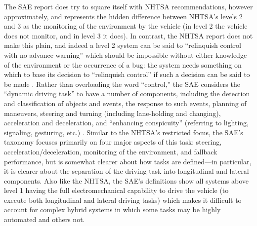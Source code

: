 The SAE report does try to square itself with NHTSA recommendations,
however approximately, and represents the hidden difference between
NHTSA's levels 2 and 3 as the monitoring of the environment by the
vehicle (in level 2 the vehicle does not monitor, and in level 3 it
does). In contrast, the NHTSA report does not make this plain, and
indeed a level 2 system can be said to ``relinquish control with no
advance warning'' which should be impossible without either knowledge of the
environment or the occurrence of a bug: the system needs something on
which to base its decision to ``relinquish control'' if such a decision
can be said to be made \cite[p. 5]{NHTSA}. Rather than overloading the word ``control,''
the SAE considers the ``dynamic driving task'' to have a number of
components, including the detection and classification of objects and
events, the response to such events, planning of maneuvers, steering
and turning (including lane-holding and changing), acceleration and
deceleration, and ``enhancing conspicuity'' (referring to lighting,
signaling, gesturing, etc.) \cite[p. 6]{SAE}. Similar to the NHTSA's
restricted focus, the SAE's taxonomy 
focuses primarily on four major aspects of this task:
steering, acceleration/deceleration, monitoring of the environment,
and fallback performance, but is somewhat clearer about how tasks are
defined---in particular, it is clearer about the separation of the
driving task into longitudinal and lateral components. Also like the
NHTSA, the SAE's definitions show all systems above level 1 having the
full electromechanical capability to drive the vehicle (to execute
both longitudinal and lateral driving tasks) which makes it difficult
to account for complex hybrid systems in which some tasks may be
highly automated and others not.



